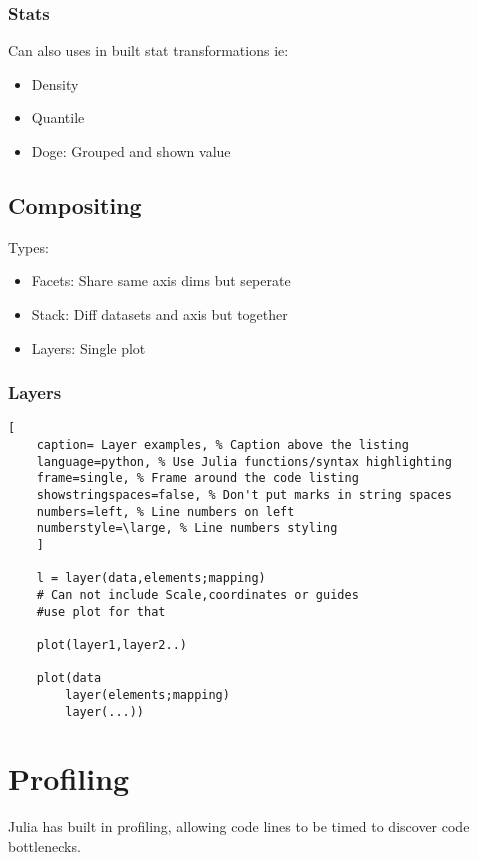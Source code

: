 \documentclass[11pt]{scrartcl} %
\begin{document}
\subsubsection{Stats}

Can also uses in built stat transformations ie:

\begin{itemize}
	\item Density 
	\item Quantile
	\item Doge: Grouped and shown value
\end{itemize}

\subsection{Compositing}

Types:
\begin{itemize}
	\item Facets: Share same axis dims but seperate
	\item Stack: Diff datasets and axis but together
	\item Layers: Single plot
\end{itemize}

\subsubsection{Layers}

\begin{lstlisting}[
	caption= Layer examples, % Caption above the listing
	language=python, % Use Julia functions/syntax highlighting
	frame=single, % Frame around the code listing
	showstringspaces=false, % Don't put marks in string spaces
	numbers=left, % Line numbers on left
	numberstyle=\large, % Line numbers styling
	]

	l = layer(data,elements;mapping) 
	# Can not include Scale,coordinates or guides
	#use plot for that

	plot(layer1,layer2..)

	plot(data
		layer(elements;mapping)
		layer(...))

\end{lstlisting}

\newpage
\section{Profiling}

Julia has built in profiling, allowing code lines to be timed to discover code bottlenecks.\\
\end{document}
